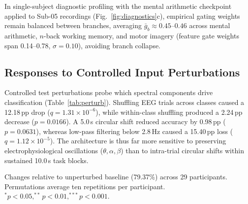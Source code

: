 \documentclass[journal]{IEEEtran}
\begin{document}
In single-subject diagnostic profiling with the mental arithmetic checkpoint applied to Sub-05 recordings (Fig.~\ref{fig:diagnostics}c), empirical gating weights remain balanced between branches, averaging $\bar{g}_b \approx 0.45\text{--}0.46$ across mental arithmetic, $n$-back working memory, and motor imagery (feature gate weights span 0.14--0.78, $\sigma = 0.10$), avoiding branch collapse.

\subsection{Responses to Controlled Input Perturbations}
Controlled test perturbations probe which spectral components drive classification (Table~\ref{tab:perturb}). Shuffling EEG trials across classes caused a 12.18\,pp drop ($q = 1.31\times 10^{-6}$), while within-class shuffling produced a 2.24\,pp decrease ($p = 0.0166$). A 5.0\,s circular shift reduced accuracy by 0.98\,pp ($p = 0.0631$), whereas low-pass filtering below 2.8\,Hz caused a 15.40\,pp loss ($q = 1.12\times 10^{-5}$). The architecture is thus far more sensitive to preserving electrophysiological oscillations ($\theta, \alpha, \beta$) than to intra-trial circular shifts within sustained 10.0\,s task blocks.

\begin{table}[!t]
\centering
\caption{Full-model performance under controlled test-input perturbations on the TU Berlin benchmark.}
\label{tab:perturb}
\par\smallskip
{\scriptsize Changes relative to unperturbed baseline (79.37\%) across 29 participants. Permutations average ten repetitions per participant. $^{*}p<0.05, ^{**}p<0.01, ^{***}p<0.001$.}
\end{table}
\end{document}
